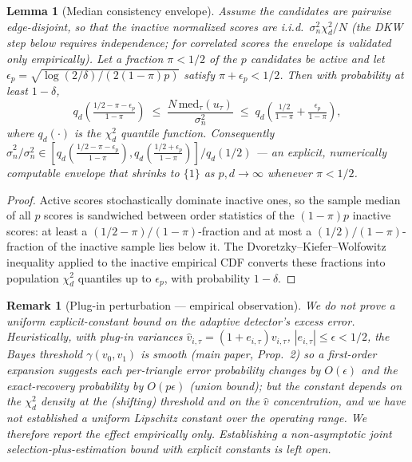 \documentclass[11pt]{article}
\newtheorem{lemma}[theorem]{Lemma}
\newtheorem{remark}[theorem]{Remark}
\begin{document}
\begin{lemma}[Median consistency envelope]\label{lem:median}
Assume the candidates are pairwise edge-disjoint, so that the inactive
normalized scores are i.i.d.\ $\sigma_n^2\chi^2_d/N$ (the DKW step below
requires independence; for correlated scores the envelope is validated only
empirically). Let a fraction $\pi<1/2$ of the $p$ candidates be active and let
$\epsilon_p=\sqrt{\log(2/\delta)/(2(1-\pi)p)}$ satisfy $\pi+\epsilon_p<1/2$.
Then with probability at least $1-\delta$,
\[
q_{d}\!\left(\tfrac{1/2-\pi-\epsilon_p}{1-\pi}\right)
\;\le\; \frac{N\,\mathrm{med}_\tau(u_\tau)}{\sigma_n^2}
\;\le\; q_{d}\!\left(\tfrac{1/2}{1-\pi}+\tfrac{\epsilon_p}{1-\pi}\right),
\]
where $q_d(\cdot)$ is the $\chi^2_d$ quantile function. Consequently
$\hat\sigma_n^2/\sigma_n^2\in[q_d(\frac{1/2-\pi-\epsilon_p}{1-\pi}),
q_d(\frac{1/2+\epsilon_p}{1-\pi})]/q_d(1/2)$ --- an explicit, numerically
computable envelope that shrinks to $\{1\}$ as $p,d\to\infty$ whenever
$\pi<1/2$.
\end{lemma}
\begin{proof}
Active scores stochastically dominate inactive ones, so the sample median of
all $p$ scores is sandwiched between order statistics of the $(1-\pi)p$
inactive scores: at least a $(1/2-\pi)/(1-\pi)$-fraction and at most a
$(1/2)/(1-\pi)$-fraction of the inactive sample lies below it. The
Dvoretzky--Kiefer--Wolfowitz inequality applied to the inactive empirical CDF
converts these fractions into population $\chi^2_d$ quantiles up to
$\epsilon_p$, with probability $1-\delta$.
\end{proof}

\begin{remark}[Plug-in perturbation --- empirical observation]\label{prop:plugin}
We do \emph{not} prove a uniform explicit-constant bound on the adaptive
detector's excess error. Heuristically, with plug-in variances
$\hat v_{i,\tau}=(1+e_{i,\tau})v_{i,\tau}$, $|e_{i,\tau}|\le\epsilon<1/2$, the
Bayes threshold $\gamma(v_0,v_1)$ is smooth (main paper, Prop.~2) so a
first-order expansion suggests each per-triangle error probability changes by
$O(\epsilon)$ and the exact-recovery probability by $O(p\epsilon)$ (union
bound); but the constant depends on the $\chi^2_d$ density at the (shifting)
threshold and on the $\hat v$ concentration, and we have not established a
\emph{uniform} Lipschitz constant over the operating range. We therefore
report the effect empirically only. Establishing a non-asymptotic joint
selection-plus-estimation bound with explicit constants is left open.
\end{remark}
\end{document}
